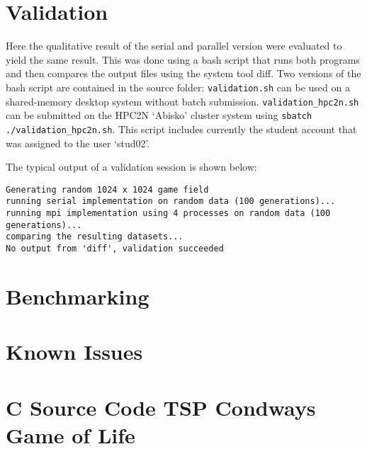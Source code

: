 \documentclass[a4paper,11pt,twoside]{article}
\begin{document}
\section{Validation}
Here the qualitative result of the serial and parallel version were evaluated to yield the same result. This was done using a bash script that runs both programs and then compares the output files using the system tool diff. Two versions of the bash script are contained in the source folder: \verb+validation.sh+ can be used on a shared-memory desktop system without batch submission. \verb+validation_hpc2n.sh+ can be submitted on the HPC2N `Abisko' cluster system using \verb+sbatch ./validation_hpc2n.sh+. This script includes currently the student account that was assigned to the user `stud02'.

The typical output of a validation session is shown below:
\begin{verbatim}
Generating random 1024 x 1024 game field
running serial implementation on random data (100 generations)...
running mpi implementation using 4 processes on random data (100 generations)...
comparing the resulting datasets...
No output from 'diff', validation succeeded
\end{verbatim}

\section{Benchmarking}


\section{Known Issues}



\appendix
\section{C Source Code TSP Condways Game of Life}{\label{app:gol}}
\end{document}

